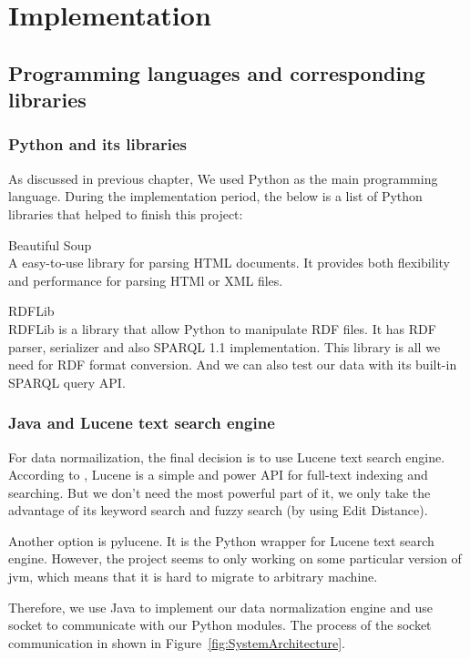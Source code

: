 \chapter{Implementation}\label{chap:impl}

\section{Programming languages and corresponding libraries}

\subsection{Python and its libraries}
As discussed in previous chapter, We used Python as the main programming language. During the implementation period, the below is a list of Python libraries that helped to finish this project:
\begin{description}
	\item Beautiful Soup \hfill \\
	A easy-to-use library for parsing HTML documents. It provides both flexibility and performance for parsing HTMl or XML files.
	\item RDFLib \hfill \\
	RDFLib is a library that allow Python to manipulate RDF files. It has RDF parser, serializer and also SPARQL 1.1 implementation. This library is all we need for RDF format conversion. And we can also test our data with its built-in SPARQL query API.
\end{description}

\subsection{Java and Lucene text search engine}
For data normailization, the final decision is to use Lucene text search engine. According to \cite{McCandless2010LAS}, Lucene is a simple and power API for full-text indexing and searching. But we don't need the most powerful part of it, we only take the advantage of its keyword search and fuzzy search (by using Edit Distance\cite{Cormen2001IA}).

Another option is pylucene. It is the Python wrapper for Lucene text search engine. However, the project seems to only working on some particular version of \gls{jvm}, which means that it is hard to migrate to arbitrary machine.

Therefore, we use Java to implement our data normalization engine and use socket to communicate with our Python modules. The process of the socket communication in shown in Figure~\ref{fig:SystemArchitecture}.

